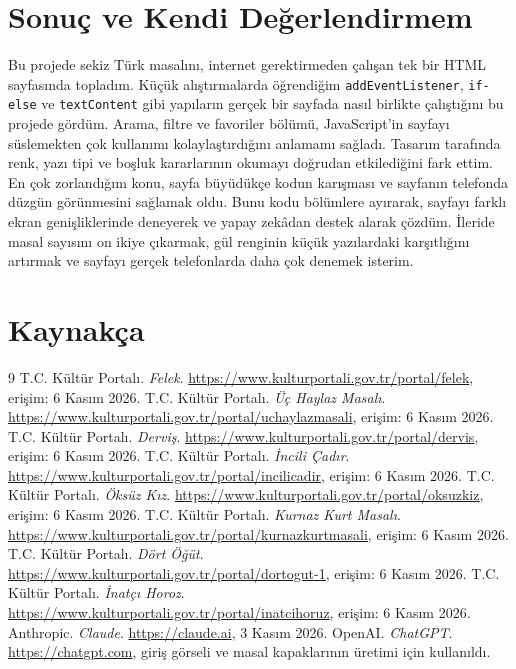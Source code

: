 \documentclass[12pt,a4paper]{article}
\begin{document}
\section{Sonuç ve Kendi Değerlendirmem}
Bu projede sekiz Türk masalını, internet gerektirmeden çalışan tek bir HTML sayfasında topladım. Küçük alıştırmalarda öğrendiğim \texttt{addEventListener}, \texttt{if-else} ve \texttt{textContent} gibi yapıların gerçek bir sayfada nasıl birlikte çalıştığını bu projede gördüm. Arama, filtre ve favoriler bölümü, JavaScript'in sayfayı süslemekten çok kullanımı kolaylaştırdığını anlamamı sağladı. Tasarım tarafında renk, yazı tipi ve boşluk kararlarının okumayı doğrudan etkilediğini fark ettim. En çok zorlandığım konu, sayfa büyüdükçe kodun karışması ve sayfanın telefonda düzgün görünmesini sağlamak oldu. Bunu kodu bölümlere ayırarak, sayfayı farklı ekran genişliklerinde deneyerek ve yapay zekâdan destek alarak çözdüm. İleride masal sayısını on ikiye çıkarmak, gül renginin küçük yazılardaki karşıtlığını artırmak ve sayfayı gerçek telefonlarda daha çok denemek isterim.

\section{Kaynakça}
\begin{thebibliography}{9}
 T.C. Kültür Portalı. \emph{Felek}. \url{https://www.kulturportali.gov.tr/portal/felek}, erişim: 6 Kasım 2026.
 T.C. Kültür Portalı. \emph{Üç Haylaz Masalı}. \url{https://www.kulturportali.gov.tr/portal/uchaylazmasali}, erişim: 6 Kasım 2026.
 T.C. Kültür Portalı. \emph{Derviş}. \url{https://www.kulturportali.gov.tr/portal/dervis}, erişim: 6 Kasım 2026.
 T.C. Kültür Portalı. \emph{İncili Çadır}. \url{https://www.kulturportali.gov.tr/portal/incilicadir}, erişim: 6 Kasım 2026.
 T.C. Kültür Portalı. \emph{Öksüz Kız}. \url{https://www.kulturportali.gov.tr/portal/oksuzkiz}, erişim: 6 Kasım 2026.
 T.C. Kültür Portalı. \emph{Kurnaz Kurt Masalı}. \url{https://www.kulturportali.gov.tr/portal/kurnazkurtmasali}, erişim: 6 Kasım 2026.
 T.C. Kültür Portalı. \emph{Dört Öğüt}. \url{https://www.kulturportali.gov.tr/portal/dortogut-1}, erişim: 6 Kasım 2026.
 T.C. Kültür Portalı. \emph{İnatçı Horoz}. \url{https://www.kulturportali.gov.tr/portal/inatcihoruz}, erişim: 6 Kasım 2026.
 Anthropic. \emph{Claude}. \url{https://claude.ai}, 3 Kasım 2026.
 OpenAI. \emph{ChatGPT}. \url{https://chatgpt.com}, giriş görseli ve masal kapaklarının üretimi için kullanıldı.
\end{thebibliography}
\end{document}
